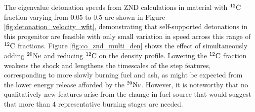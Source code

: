 \documentclass[iop,apj]{emulateapj}
\newcommand{\C}[1]{\ensuremath{{}^{#1}{\rm C}}}
\newcommand{\Ne}[1]{\ensuremath{{}^{#1}{\rm Ne}}}
\begin{document}
The eigenvalue detonation speeds from ZND calculations in material with \C{12} fraction varying from 0.05 to 0.5 are shown in Figure \ref{fig:detonation_velocity_wfit}, demonstrating that self-supported detonations in this progenitor are feasible with only small variation in speed across this range of \C{12} fractions. 
Figure \ref{fig:co_znd_multi_den} shows
the effect of simultaneously adding \Ne{20} and reducing \C{12} on the density profile.
Lowering the \C{12} fraction weakens the shock and
lengthens the timescales of the step features, corresponding to more slowly
burning fuel and ash, as might be expected from the lower energy release
afforded by the \Ne{20}. However, it is noteworthy that no qualitatively
new features arise from the change in fuel source that would suggest
that more than 4 representative burning stages are needed.
\end{document}
